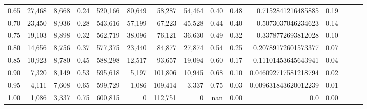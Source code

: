 \begin{tabular}{rrrrrrrrrrrrrrr}
0.65 &  27,468 &  8,668 &  0.24 &  520,166 &   80,649 &   58,287 &   54,464 &  0.40 &  0.48 &    0.7152841216485885 &      0.19 \\
0.70 &  23,450 &  8,936 &  0.28 &  543,616 &   57,199 &   67,223 &   45,528 &  0.44 &  0.40 &    0.5073037046234623 &      0.14 \\
0.75 &  19,103 &  8,898 &  0.32 &  562,719 &   38,096 &   76,121 &   36,630 &  0.49 &  0.32 &    0.3378772693812028 &      0.10 \\
0.80 &  14,656 &  8,756 &  0.37 &  577,375 &   23,440 &   84,877 &   27,874 &  0.54 &  0.25 &   0.20789172601573377 &      0.07 \\
0.85 &  10,923 &  8,780 &  0.45 &  588,298 &   12,517 &   93,657 &   19,094 &  0.60 &  0.17 &   0.11101453645643941 &      0.04 \\
0.90 &   7,320 &  8,149 &  0.53 &  595,618 &    5,197 &  101,806 &   10,945 &  0.68 &  0.10 &  0.046092717581218794 &      0.02 \\
0.95 &   4,111 &  7,608 &  0.65 &  599,729 &    1,086 &  109,414 &    3,337 &  0.75 &  0.03 &  0.009631843620012239 &      0.01 \\
1.00 &   1,086 &  3,337 &  0.75 &  600,815 &        0 &  112,751 &        0 &   nan &  0.00 &                   0.0 &      0.00 \\
\bottomrule
\end{tabular}
